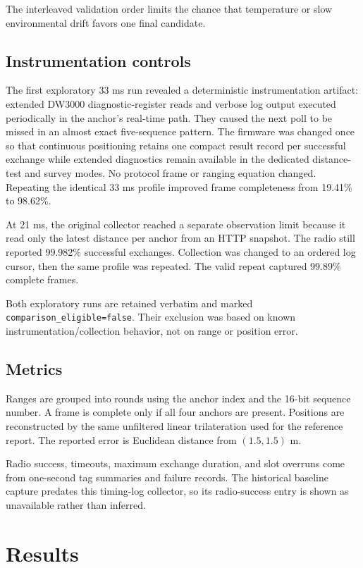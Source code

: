 \documentclass[11pt,a4paper]{article}
\begin{document}
The interleaved validation order limits the chance that temperature or slow
environmental drift favors one final candidate.

\subsection{Instrumentation controls}

The first exploratory 33 ms run revealed a deterministic instrumentation
artifact: extended DW3000 diagnostic-register reads and verbose log output
executed periodically in the anchor's real-time path. They caused the next
poll to be missed in an almost exact five-sequence pattern. The firmware was
changed once so that continuous positioning retains one compact result record
per successful exchange while extended diagnostics remain available in the
dedicated distance-test and survey modes. No protocol frame or ranging
equation changed. Repeating the identical 33 ms profile improved frame
completeness from 19.41\% to 98.62\%.

At 21 ms, the original collector reached a separate observation limit because
it read only the latest distance per anchor from an HTTP snapshot. The radio
still reported 99.982\% successful exchanges. Collection was changed to an
ordered log cursor, then the same profile was repeated. The valid repeat
captured 99.89\% complete frames.

Both exploratory runs are retained verbatim and marked
\texttt{comparison\_eligible=false}. Their exclusion was based on known
instrumentation/collection behavior, not on range or position error.

\subsection{Metrics}

Ranges are grouped into rounds using the anchor index and the 16-bit sequence
number. A frame is complete only if all four anchors are present. Positions
are reconstructed by the same unfiltered linear trilateration used for the
reference report. The reported error is Euclidean distance from
$(1.5,1.5)$ m.

Radio success, timeouts, maximum exchange duration, and slot overruns come
from one-second tag summaries and failure records. The historical baseline
capture predates this timing-log collector, so its radio-success entry is
shown as unavailable rather than inferred.

\section{Results}
\end{document}
